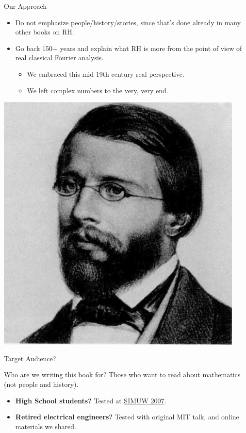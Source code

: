 \documentclass{beamer}
\begin{document}
\begin{frame}{Our Approach}
  \begin{block}{}
    \begin{itemize}
      \item Do not emphasize people/history/stories, since that's done already in many other books on RH.
      \item   Go back 150+ years and explain what RH is more from the point of view of real classical Fourier analysis.
            \begin{itemize}
              \item We embraced this mid-19th century real perspective.
              \item We left complex numbers to the very, very end.
            \end{itemize}
    \end{itemize}
  \end{block}
  \begin{center}
    \includegraphics[height=.4\textheight]{pics/riemann}
  \end{center}

\end{frame}


\begin{frame}{Target Audience?}

  Who are we writing this book for? Those who want to read about mathematics (not people and history).

  \begin{itemize}
    \item \textbf{High School students?} Tested at \href{https://wstein.org/edu/2007/simuw07/}{SIMUW 2007}.
    \item \textbf{Retired electrical engineers?}  Tested with original MIT talk, and  online materials we shared.
  \end{itemize}


\end{frame}
\end{document}
